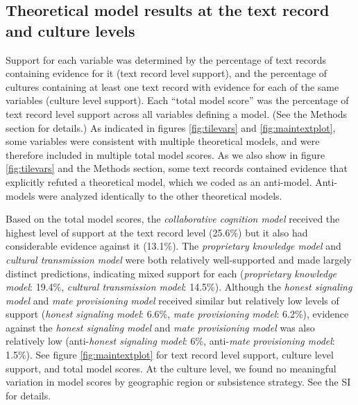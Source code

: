\documentclass[
  11pt,
]{article}
\begin{document}
\hypertarget{theoretical-model-results-at-the-text-record-and-culture-levels}{%
\subsection{Theoretical model results at the text record and culture levels}\label{theoretical-model-results-at-the-text-record-and-culture-levels}}

Support for each variable was determined by the percentage of text records containing evidence for it (text record level support), and the percentage of cultures containing at least one text record with evidence for each of the same variables (culture level support). Each ``total model score'' was the percentage of text record level support across all variables defining a model. (See the Methods section for details.) As indicated in figures \ref{fig:tilevars} and \ref{fig:maintextplot}, some variables were consistent with multiple theoretical models, and were therefore included in multiple total model scores. As we also show in figure \ref{fig:tilevars} and the Methods section, some text records contained evidence that explicitly refuted a theoretical model, which we coded as an anti-model. Anti-models were analyzed identically to the other theoretical models.

Based on the total model scores, the \emph{collaborative cognition model} received the highest level of support at the text record level (25.6\%) but it also had considerable evidence against it (13.1\%). The \emph{proprietary knowledge model} and \emph{cultural transmission model} were both relatively well-supported and made largely distinct predictions, indicating mixed support for each (\emph{proprietary knowledge model}: 19.4\%, \emph{cultural transmission model}: 14.5\%). Although the \emph{honest signaling model} and \emph{mate provisioning model} received similar but relatively low levels of support (\emph{honest signaling model}: 6.6\%, \emph{mate provisioning model}: 6.2\%), evidence against the \emph{honest signaling model} and \emph{mate provisioning model} was also relatively low (anti-\emph{honest signaling model}: 6\%, anti-\emph{mate provisioning model}: 1.5\%). See figure \ref{fig:maintextplot} for text record level support, culture level support, and total model scores. At the culture level, we found no meaningful variation in model scores by geographic region or subsistence strategy. See the SI for details.
\end{document}
